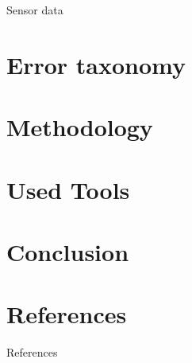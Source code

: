 \documentclass{beamer}
\begin{document}
            \begin{frame}{Sensor data}

            \end{frame}
    \section{Error taxonomy}
    \section{Methodology}
    \section{Used Tools}
    \section{Conclusion}

    \section*{References}
        \begin{frame}[allowframebreaks]{References}
            
            
        \end{frame}
\end{document}
